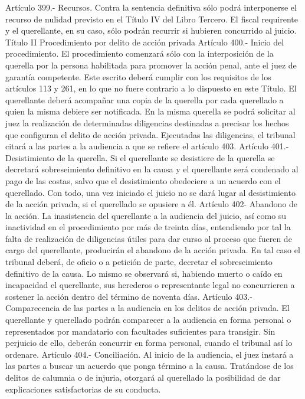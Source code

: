     Artículo 399.- Recursos. Contra la sentencia definitiva sólo podrá interponerse el recurso de nulidad previsto en el Título IV del Libro Tercero. El fiscal requirente y el querellante, en su caso, sólo podrán recurrir si hubieren concurrido al juicio.
    Título II
    Procedimiento por delito de acción privada
    Artículo 400.- Inicio del procedimiento. El procedimiento comenzará sólo con la interposición de la querella por la persona habilitada para promover la acción penal, ante el juez de garantía competente. Este escrito deberá cumplir con los requisitos de los artículos 113 y 261, en lo que no fuere contrario a lo dispuesto en este Título.
    El querellante deberá acompañar una copia de la querella por cada querellado a quien la misma debiere ser notificada.
    En la misma querella se podrá solicitar al juez la realización de determinadas diligencias destinadas a precisar los hechos que configuran el delito de acción privada. Ejecutadas las diligencias, el tribunal citará a las partes a la audiencia a que se refiere el artículo 403.
    Artículo 401.- Desistimiento de la querella. Si el querellante se desistiere de la querella se decretará sobreseimiento definitivo en la causa y el querellante será condenado al pago de las costas, salvo que el desistimiento obedeciere a un acuerdo con el querellado.
    Con todo, una vez iniciado el juicio no se dará lugar al desistimiento de la acción privada, si el querellado se opusiere a él.
    Artículo 402- Abandono de la acción. La inasistencia del querellante a la audiencia del juicio, así como su inactividad en el procedimiento por más de treinta días, entendiendo por tal la falta de realización de diligencias útiles para dar curso al proceso que fueren de cargo del querellante, producirán el abandono de la acción privada. En tal caso el tribunal deberá, de oficio o a petición de parte, decretar el sobreseimiento definitivo de la causa.
    Lo mismo se observará si, habiendo muerto o caído en incapacidad el querellante, sus herederos o representante legal no concurrieren a sostener la acción dentro del término de noventa días.
    Artículo 403.- Comparecencia de las partes a la audiencia en los delitos de acción privada. El querellante y querellado podrán comparecer a la audiencia en forma personal o representados por mandatario con facultades suficientes para transigir. Sin perjuicio de ello, deberán concurrir en forma personal, cuando el tribunal así lo ordenare.
    Artículo 404.- Conciliación. Al inicio de la audiencia, el juez instará a las partes a buscar un acuerdo que ponga término a la causa. Tratándose de los delitos de calumnia o de injuria, otorgará al querellado la posibilidad de dar explicaciones satisfactorias de su conducta.
